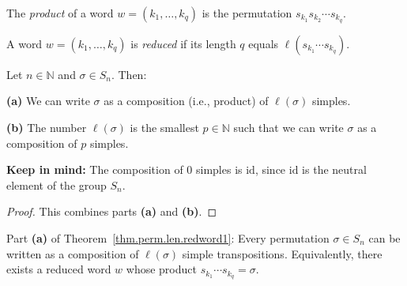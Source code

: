 \begin{definition}
\label{def.perm.wordProd}
\leanhelper
\leanok
The \emph{product} of a word $w = (k_1, \ldots, k_q)$ is the
permutation $s_{k_1} s_{k_2} \cdots s_{k_q}$.
\end{definition}

\begin{definition}
\label{def.perm.IsReduced}
\leanhelper
\leanok
A word $w = (k_1, \ldots, k_q)$ is \emph{reduced} if its length $q$ equals
$\ell(s_{k_1} \cdots s_{k_q})$.
\end{definition}


\begin{theorem}
\label{thm.perm.len.redword1}
\leantarget
\leanok
Let $n \in \mathbb{N}$ and $\sigma \in S_n$. Then:
\medskip

\textbf{(a)} We can write $\sigma$ as a composition (i.e., product) of
$\ell(\sigma)$ simples.
\medskip

\textbf{(b)} The number $\ell(\sigma)$ is the smallest $p \in \mathbb{N}$
such that we can write $\sigma$ as a composition of $p$ simples.
\medskip

\textbf{Keep in mind:} The composition of $0$ simples is $\mathrm{id}$,
since $\mathrm{id}$ is the neutral element of the group $S_n$.
\end{theorem}

\begin{proof}
This combines parts \textbf{(a)} and \textbf{(b)}.
\end{proof}

\begin{theorem}
\label{thm.perm.len.redword1.a}
\leanhelper
\leanok
Part \textbf{(a)} of Theorem~\ref{thm.perm.len.redword1}: Every permutation $\sigma \in S_n$
can be written as a composition of $\ell(\sigma)$ simple transpositions.
Equivalently, there exists a reduced word $w$ whose product $s_{k_1} \cdots s_{k_q} = \sigma$.
\end{theorem}

